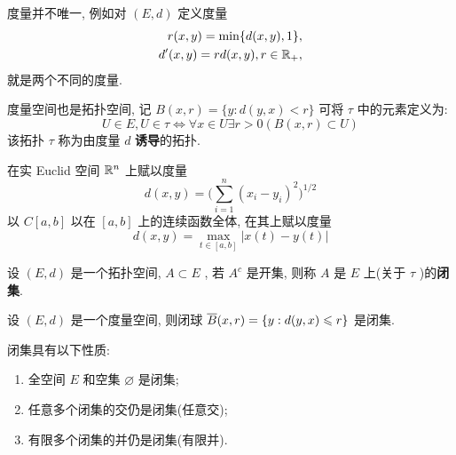      \begin{Remark}\label{rmk:度量不唯一}
          度量并不唯一, 例如对 $ (E, d) $ 定义度量
          \begin{equation*}
               \begin{aligned}
                    r(x, y) = \min\{ d(x, y), 1 \}, \\
                    d'(x, y) = rd(x, y), r\in\R_{+},
               \end{aligned}
          \end{equation*}
          就是两个不同的度量. 
     \end{Remark}
     
     度量空间也是拓扑空间, 记 $ B(x, r)=\{ y: d(y, x)<r \} $ 可将 $ \tau $ 中的元素定义为: 
     \[
          U\in E, U\in \tau\Leftrightarrow \forall x\in U\exists r>0(B(x, r)\subset U)
     \] 
     该拓扑 $ \tau $ 称为由度量 $ d $ \textbf{诱导}的拓扑. 

     \begin{Example} 
          在实 Euclid 空间 $ \R^{n} $ 上赋以度量
          \begin{equation}
               d(x, y)=\bigg( \sum_{i=1}^{n}(x_{i}-y_{i})^{2} \bigg)^{1/2}\tag{Euclid距离}
          \end{equation}
          以 $ C[a, b] $ 以在 $ [a, b] $ 上的连续函数全体, 在其上赋以度量
          \begin{equation}
               d(x, y) = \max_{t\in [a, b]} |x(t)-y(t)|\tag{一致距离}
          \end{equation}
     \end{Example}

     \begin{Definition}[闭集]\label{def:闭集}
          设 $ (E, d) $ 是一个拓扑空间, $ A\subset E $ , 若 $ A^{c} $ 是开集, 则称 $ A $ 是 $ E $ 上(关于 $ \tau $ )的\textbf{闭集}.
     \end{Definition}
     \begin{Example}
          设 $ (E, d) $ 是一个度量空间, 则闭球 $ \baro{B}(x, r)=\{ y: d(y, x)\leqslant r \} $ 是闭集. 
     \end{Example} 
     \begin{Proposition}\label{prop:闭集的性质}
          闭集具有以下性质:
          \begin{enumerate}[(1)]
               \item 全空间 $ E $ 和空集 $ \varnothing $ 是闭集;
               \item 任意多个闭集的交仍是闭集(任意交);
               \item 有限多个闭集的并仍是闭集(有限并).
          \end{enumerate}
     \end{Proposition}

